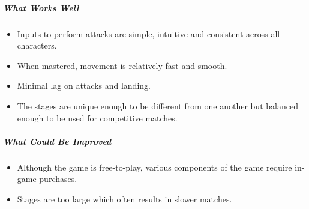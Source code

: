 \subparagraph{What Works Well}

\begin{itemize}
    \item Inputs to perform attacks are simple, intuitive and consistent across all characters.
    \item When mastered, movement is relatively fast and smooth.
    \item Minimal lag on attacks and landing.
    \item The stages are unique enough to be different from one another but balanced enough to be used for competitive matches.
\end{itemize}

\subparagraph{What Could Be Improved}

\begin{itemize}
    \item Although the game is free-to-play, various components of the game require in-game purchases.
    \item Stages are too large which often results in slower matches.
\end{itemize}
